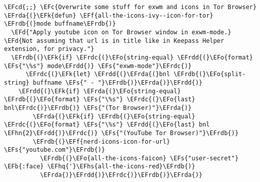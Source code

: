 \documentclass[a4wide,10pt]{article}
\newcommand{\EFc}[1]{\textcolor{EFc}{#1}} %
\newcommand{\EFcd}[1]{\textcolor{EFcd}{#1}} %
\newcommand{\EFs}[1]{\textcolor{EFs}{#1}} %
\newcommand{\EFd}[1]{\textcolor{EFd}{#1}} %
\newcommand{\EFk}[1]{\textcolor{EFk}{#1}} %
\newcommand{\EFb}[1]{\textcolor{EFb}{#1}} %
\newcommand{\EFf}[1]{\textcolor{EFf}{#1}} %
\newcommand{\EFo}[1]{\textcolor{EFo}{#1}} %
\newcommand{\EFhn}[1]{\textcolor{EFhn}{\textbf{#1}}} %
\newcommand{\EFhq}[1]{\textcolor{EFhq}{#1}} %
\newcommand{\EFhs}[1]{\textcolor{EFhs}{#1}} %
\newcommand{\EFrda}[1]{\textcolor{EFrda}{#1}} %
\newcommand{\EFrdb}[1]{\textcolor{EFrdb}{#1}} %
\newcommand{\EFrdc}[1]{\textcolor{EFrdc}{#1}} %
\newcommand{\EFrdd}[1]{\textcolor{EFrdd}{#1}} %
\begin{document}
\begin{Code}
\begin{Verbatim}
\EFcd{;;} \EFc{Overwrite some stuff for exwm and icons in Tor Browser}
\EFrda{(}\EFk{defun} \EFf{all-the-icons-ivy--icon-for-tor} \EFrdb{(}mode buffname\EFrdb{)}
  \EFd{"Apply youtube icon on Tor Browser window in exwm-mode.}
\EFd{Not assuming that url is in title like in Keepass Helper extension, for privacy."}
  \EFrdb{(}\EFk{if} \EFrdc{(}\EFo{string-equal} \EFrdd{(}\EFo{format} \EFs{"\%s"} mode\EFrdd{)} \EFs{"exwm-mode"}\EFrdc{)}
      \EFrdc{(}\EFk{let} \EFrdd{(}\EFrda{(}bnl \EFrdb{(}\EFo{split-string} buffname \EFs{" - "}\EFrdb{)}\EFrda{)}\EFrdd{)}
	\EFrdd{(}\EFk{if} \EFrda{(}\EFo{string-equal} \EFrdb{(}\EFo{format} \EFs{"\%s"} \EFrdc{(}\EFo{last} bnl\EFrdc{)}\EFrdb{)} \EFs{"(Tor Browser)"}\EFrda{)}
	    \EFrda{(}\EFk{if} \EFrdb{(}\EFo{string-equal} \EFrdc{(}\EFo{format} \EFs{"\%s"} \EFrdd{(}\EFo{last} bnl \EFhn{2}\EFrdd{)}\EFrdc{)} \EFs{"(YouTube Tor Browser)"}\EFrdb{)}
		\EFrdb{(}\EFf{nerd-icons-icon-for-url} \EFs{"youtube.com"}\EFrdb{)}
	      \EFrdb{(}\EFo{all-the-icons-faicon} \EFs{"user-secret"} \EFb{:face} \EFhq{'}\EFhs{all-the-icons-red}\EFrdb{)}
	      \EFrda{)}\EFrdd{)}\EFrdc{)}\EFrdb{)}\EFrda{)}


\end{Verbatim}
\end{Code}
\end{document}
